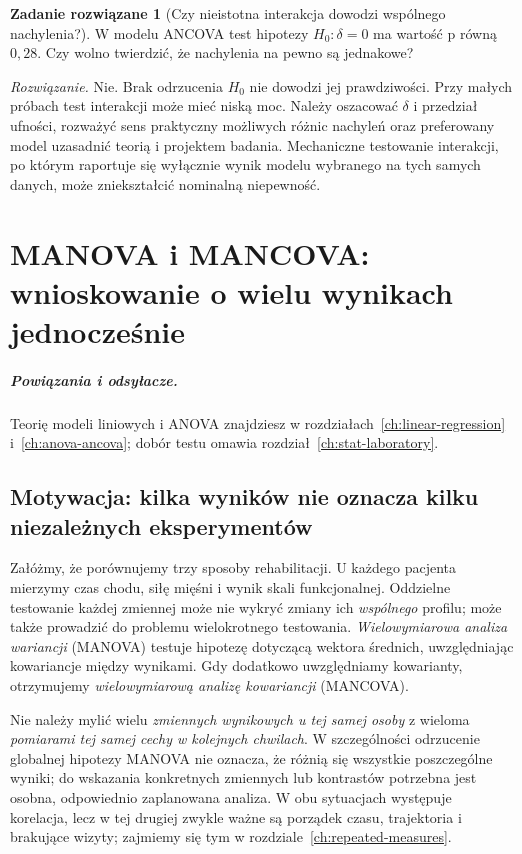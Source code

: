 \documentclass[11pt,a4paper,oneside]{report}
\numberwithin{equation}{chapter}
\theoremstyle{plain}
\theoremstyle{definition}
\newtheorem{zadanie}{Zadanie rozwiązane}[chapter]
\theoremstyle{remark}
\begin{document}
\begin{zadanie}[Czy nieistotna interakcja dowodzi wspólnego nachylenia?]
W modelu ANCOVA test hipotezy $H_0:\delta=0$ ma wartość p równą $0{,}28$. Czy wolno twierdzić, że nachylenia na pewno są jednakowe?\par\emph{Rozwiązanie.} Nie. Brak odrzucenia $H_0$ nie dowodzi jej prawdziwości. Przy małych próbach test interakcji może mieć niską moc. Należy oszacować $\delta$ i przedział ufności, rozważyć sens praktyczny możliwych różnic nachyleń oraz preferowany model uzasadnić teorią i projektem badania. Mechaniczne testowanie interakcji, po którym raportuje się wyłącznie wynik modelu wybranego na tych samych danych, może zniekształcić nominalną niepewność.
\end{zadanie}


\chapter{MANOVA i MANCOVA: wnioskowanie o wielu wynikach jednocześnie}
\label{ch:manova-mancova}
\paragraph{Powiązania i odsyłacze.} Teorię modeli liniowych i ANOVA znajdziesz w rozdziałach~\ref{ch:linear-regression} i~\ref{ch:anova-ancova}; dobór testu omawia rozdział~\ref{ch:stat-laboratory}.


\section{Motywacja: kilka wyników nie oznacza kilku niezależnych eksperymentów}
Załóżmy, że porównujemy trzy sposoby rehabilitacji. U każdego pacjenta mierzymy czas chodu, siłę mięśni i wynik skali funkcjonalnej. Oddzielne testowanie każdej zmiennej może nie wykryć zmiany ich \emph{wspólnego} profilu; może także prowadzić do problemu wielokrotnego testowania. \emph{Wielowymiarowa analiza wariancji} (MANOVA) testuje hipotezę dotyczącą wektora średnich, uwzględniając kowariancje między wynikami. Gdy dodatkowo uwzględniamy kowarianty, otrzymujemy \emph{wielowymiarową analizę kowariancji} (MANCOVA).

Nie należy mylić wielu \emph{zmiennych wynikowych u tej samej osoby} z wieloma \emph{pomiarami tej samej cechy w kolejnych chwilach}. W szczególności odrzucenie globalnej hipotezy MANOVA nie oznacza, że różnią się wszystkie poszczególne wyniki; do wskazania konkretnych zmiennych lub kontrastów potrzebna jest osobna, odpowiednio zaplanowana analiza. W obu sytuacjach występuje korelacja, lecz w tej drugiej zwykle ważne są porządek czasu, trajektoria i brakujące wizyty; zajmiemy się tym w rozdziale~\ref{ch:repeated-measures}.
\end{document}

